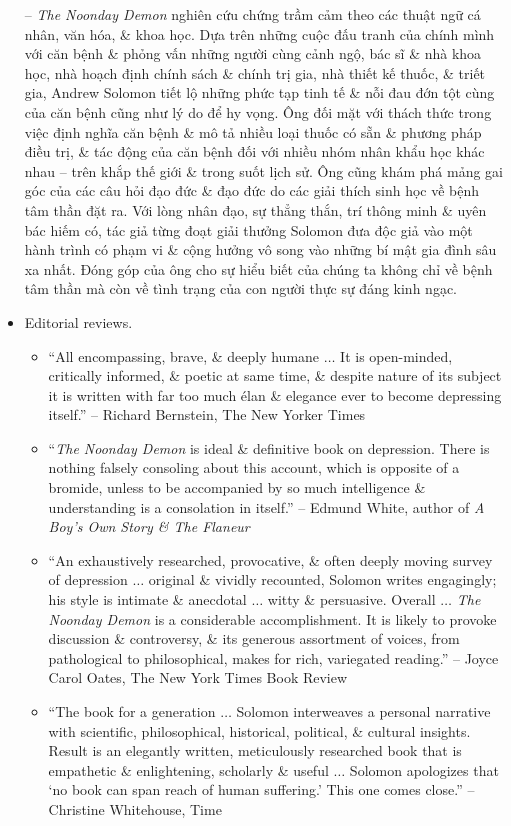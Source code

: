 \documentclass{article}
\begin{document}
\begin{itemize}
	-- {\it The Noonday Demon} nghiên cứu chứng trầm cảm theo các thuật ngữ cá nhân, văn hóa, \& khoa học. Dựa trên những cuộc đấu tranh của chính mình với căn bệnh \& phỏng vấn những người cùng cảnh ngộ, bác sĩ \& nhà khoa học, nhà hoạch định chính sách \& chính trị gia, nhà thiết kế thuốc, \& triết gia, {\sc Andrew Solomon} tiết lộ những phức tạp tinh tế \& nỗi đau đớn tột cùng của căn bệnh cũng như lý do để hy vọng. Ông đối mặt với thách thức trong việc định nghĩa căn bệnh \& mô tả nhiều loại thuốc có sẵn \& phương pháp điều trị, \& tác động của căn bệnh đối với nhiều nhóm nhân khẩu học khác nhau -- trên khắp thế giới \& trong suốt lịch sử. Ông cũng khám phá mảng gai góc của các câu hỏi đạo đức \& đạo đức do các giải thích sinh học về bệnh tâm thần đặt ra. Với lòng nhân đạo, sự thẳng thắn, trí thông minh \& uyên bác hiếm có, tác giả từng đoạt giải thưởng {\sc Solomon} đưa độc giả vào một hành trình có phạm vi \& cộng hưởng vô song vào những bí mật gia đình sâu xa nhất. Đóng góp của ông cho sự hiểu biết của chúng ta không chỉ về bệnh tâm thần mà còn về tình trạng của con người thực sự đáng kinh ngạc.
	\item {\sf Editorial reviews.}
	\begin{itemize}
		\item ``All encompassing, brave, \& deeply humane $\ldots$ It is open-minded, critically informed, \& poetic at same time, \& despite nature of its subject it is written with far too much \'elan \& elegance ever to become depressing itself.'' -- {\sc Richard Bernstein}, The New Yorker Times
		\item ``{\it The Noonday Demon} is ideal \& definitive book on depression. There is nothing falsely consoling about this account, which is opposite of a bromide, unless to be accompanied by so much intelligence \& understanding is a consolation in itself.'' -- {\sc Edmund White}, author of {\it A Boy's Own Story \& The Flaneur}
		\item ``An exhaustively researched, provocative, \& often deeply moving survey of depression $\ldots$ original \& vividly recounted, {\sc Solomon} writes engagingly; his style is intimate \& anecdotal $\ldots$ witty \& persuasive. Overall $\ldots$ {\it The Noonday Demon} is a considerable accomplishment. It is likely to provoke discussion \& controversy, \& its generous assortment of voices, from pathological to philosophical, makes for rich, variegated reading.'' -- {\sc Joyce Carol Oates}, The New York Times Book Review
		\item ``The book for a generation $\ldots$ {\sc Solomon} interweaves a personal narrative with scientific, philosophical, historical, political, \& cultural insights. Result is an elegantly written, meticulously researched book that is empathetic \& enlightening, scholarly \& useful $\ldots$ {\sc Solomon} apologizes that `no book can span reach of human suffering.' This one comes close.'' -- {\sc Christine Whitehouse}, Time

\end{itemize}
\end{itemize}
\end{document}
